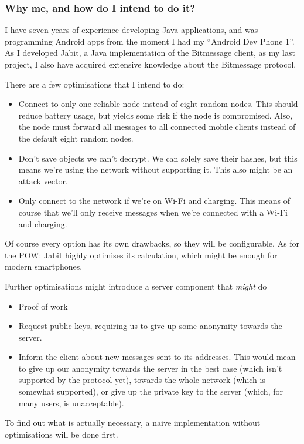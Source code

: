 \documentclass{bfh}
\begin{document}
  \subsubsection{Why me, and how do I intend to do it?}
  I have seven years of experience developing Java applications, and was programming Android apps from the moment I had my ``Android Dev Phone 1''. As I developed Jabit, a Java implementation of the Bitmessage client, as my last project, I also have acquired extensive knowledge about the Bitmessage protocol.

  There are a few optimisations that I intend to do:
  \begin{itemize}
    \item Connect to only one reliable node instead of eight random nodes. This should reduce battery usage, but yields some risk if the node is compromised. Also, the node must forward all messages to all connected mobile clients instead of the default eight random nodes.
    \item Don't save objects we can't decrypt. We can solely save their hashes, but this means we're using the network without supporting it. This also might be an attack vector.
    \item Only connect to the network if we're on Wi-Fi and charging. This means of course that we'll only receive messages when we're connected with a Wi-Fi and charging.
  \end{itemize}
  Of course every option has its own drawbacks, so they will be configurable. As for the \ac{POW}: Jabit highly optimises its calculation, which might be enough for modern smartphones.

  Further optimisations might introduce a server component that \textit{might} do
  \begin{itemize}
    \item Proof of work
    \item Request public keys, requiring us to give up some anonymity towards the server.
    \item Inform the client about new messages sent to its addresses. This would mean to give up our anonymity towards the server in the best case (which isn't supported by the protocol yet), towards the whole network (which is somewhat supported), or give up the private key to the server (which, for many users, is unacceptable).
  \end{itemize}

  To find out what is actually necessary, a naive implementation without optimisations will be done first.
\end{document}

